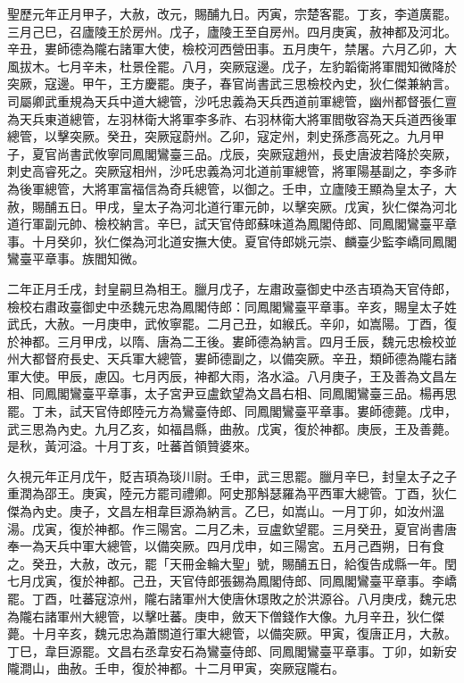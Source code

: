 \begin{pinyinscope}
 聖歷元年正月甲子，大赦，改元，賜酺九日。丙寅，宗楚客罷。丁亥，李道廣罷。三月己巳，召廬陵王於房州。戊子，廬陵王至自房州。四月庚寅，赦神都及河北。辛丑，婁師德為隴右諸軍大使，檢校河西營田事。五月庚午，禁屠。六月乙卯，大風拔木。七月辛未，杜景佺罷。八月，突厥寇邊。戊子，左豹韜衛將軍閻知微降於突厥，寇邊。甲午，王方慶罷。庚子，春官尚書武三思檢校內史，狄仁傑兼納言。司屬卿武重規為天兵中道大總管，沙吒忠義為天兵西道前軍總管，幽州都督張仁亶為天兵東道總管，左羽林衛大將軍李多祚、右羽林衛大將軍閻敬容為天兵道西後軍總管，以擊突厥。癸丑，突厥寇蔚州。乙卯，寇定州，刺史孫彥高死之。九月甲子，夏官尚書武攸寧同鳳閣鸞臺三品。戊辰，突厥寇趙州，長史唐波若降於突厥，刺史高睿死之。突厥寇相州，沙吒忠義為河北道前軍總管，將軍陽基副之，李多祚為後軍總管，大將軍富福信為奇兵總管，以御之。壬申，立廬陵王顯為皇太子，大赦，賜酺五日。甲戌，皇太子為河北道行軍元帥，以擊突厥。戊寅，狄仁傑為河北道行軍副元帥、檢校納言。辛巳，試天官侍郎蘇味道為鳳閣侍郎、同鳳閣鸞臺平章事。十月癸卯，狄仁傑為河北道安撫大使。夏官侍郎姚元崇、麟臺少監李嶠同鳳閣鸞臺平章事。族閻知微。



 二年正月壬戌，封皇嗣旦為相王。臘月戊子，左肅政臺御史中丞吉頊為天官侍郎，檢校右肅政臺御史中丞魏元忠為鳳閣侍郎：同鳳閣鸞臺平章事。辛亥，賜皇太子姓武氏，大赦。一月庚申，武攸寧罷。二月己丑，如緱氏。辛卯，如嵩陽。丁酉，復於神都。三月甲戌，以隋、唐為二王後。婁師德為納言。四月壬辰，魏元忠檢校並州大都督府長史、天兵軍大總管，婁師德副之，以備突厥。辛丑，類師德為隴右諸軍大使。甲辰，慮囚。七月丙辰，神都大雨，洛水溢。八月庚子，王及善為文昌左相、同鳳閣鸞臺平章事，太子宮尹豆盧欽望為文昌右相、同鳳閣鸞臺三品。楊再思罷。丁未，試天官侍郎陸元方為鸞臺侍郎、同鳳閣鸞臺平章事。婁師德薨。戊申，武三思為內史。九月乙亥，如福昌縣，曲赦。戊寅，復於神都。庚辰，王及善薨。是秋，黃河溢。十月丁亥，吐蕃首領贊婆來。



 久視元年正月戊午，貶吉頊為琰川尉。壬申，武三思罷。臘月辛巳，封皇太子之子重潤為邵王。庚寅，陸元方罷司禮卿。阿史那斛瑟羅為平西軍大總管。丁酉，狄仁傑為內史。庚子，文昌左相韋巨源為納言。乙巳，如嵩山。一月丁卯，如汝州溫湯。戊寅，復於神都。作三陽宮。二月乙未，豆盧欽望罷。三月癸丑，夏官尚書唐奉一為天兵中軍大總管，以備突厥。四月戊申，如三陽宮。五月己酉朔，日有食之。癸丑，大赦，改元，罷「天冊金輪大聖」號，賜酺五日，給復告成縣一年。閏七月戊寅，復於神都。己丑，天官侍郎張錫為鳳閣侍郎、同鳳閣鸞臺平章事。李嶠罷。丁酉，吐蕃寇涼州，隴右諸軍州大使唐休璟敗之於洪源谷。八月庚戌，魏元忠為隴右諸軍州大總管，以擊吐蕃。庚申，斂天下僧錢作大像。九月辛丑，狄仁傑薨。十月辛亥，魏元忠為蕭關道行軍大總管，以備突厥。甲寅，復唐正月，大赦。丁巳，韋巨源罷。文昌右丞韋安石為鸞臺侍郎、同鳳閣鸞臺平章事。丁卯，如新安隴澗山，曲赦。壬申，復於神都。十二月甲寅，突厥寇隴右。




\end{pinyinscope}
